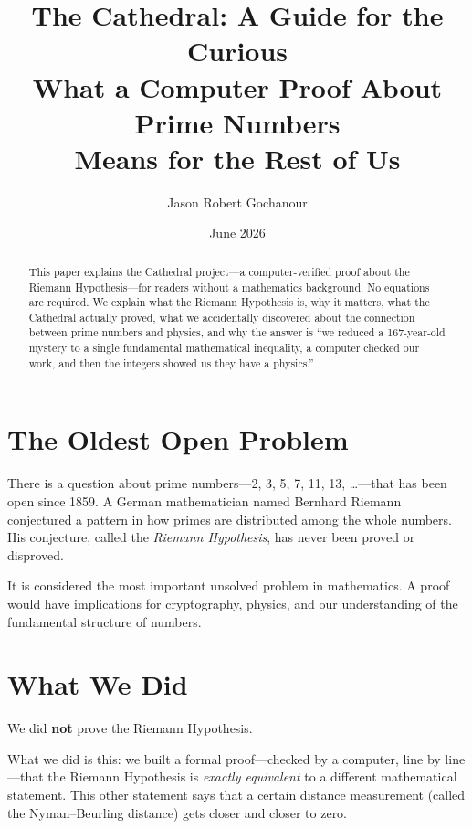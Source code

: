 \documentclass[11pt,a4paper]{article}
\title{%
  The Cathedral: A Guide for the Curious\\[4pt]
  \large What a Computer Proof About Prime Numbers\\
  \large Means for the Rest of Us%
}
\author{Jason Robert Gochanour}
\date{June 2026}
\begin{document}
\maketitle

\begin{abstract}
This paper explains the Cathedral project---a computer-verified
proof about the Riemann Hypothesis---for readers without a
mathematics background. No equations are required. We explain what
the Riemann Hypothesis is, why it matters, what the Cathedral
actually proved, what we accidentally discovered about the
connection between prime numbers and physics, and why the answer
is ``we reduced a 167-year-old mystery to a single
fundamental mathematical inequality, a computer checked our work,
and then the integers showed us they have a physics.''
\end{abstract}

\section{The Oldest Open Problem}

There is a question about prime numbers---2, 3, 5, 7, 11, 13,
\ldots---that has been open since 1859. A German mathematician
named Bernhard Riemann conjectured a pattern in how primes are
distributed among the whole numbers. His conjecture, called the
\emph{Riemann Hypothesis}, has never been proved or disproved.

It is considered the most important unsolved problem in mathematics.
A proof would have implications for cryptography, physics, and our
understanding of the fundamental structure of numbers.

\section{What We Did}

We did \textbf{not} prove the Riemann Hypothesis.

What we did is this: we built a formal proof---checked by a
computer, line by line---that the Riemann Hypothesis is
\emph{exactly equivalent} to a different mathematical statement.
This other statement says that a certain distance measurement
(called the Nyman--Beurling distance) gets closer and closer to
zero.
\end{document}
